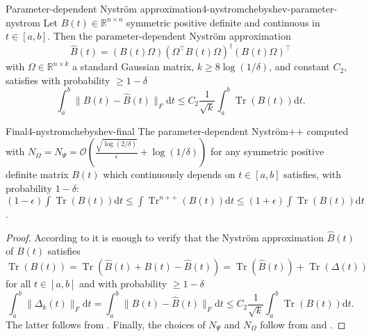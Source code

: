 \begin{lemma}{Parameter-dependent Nystr\"om approximation}{4-nystromchebyshev-parameter-nystrom}
    Let $B(t) \in \mathbb{R}^{n \times n}$ symmetric positive definite and continuous in $t \in [a, b]$. Then the parameter-dependent Nystr\"om approximation
    \begin{equation}
        \hat{B}(t) = (B(t) \Omega) (\Omega^{\top} B(t) \Omega)^{\dagger} (B(t) \Omega)^{\top}
    \end{equation}
    with $\Omega \in \mathbb{R}^{n \times k}$ a standard Gaussian matrix, $k \geq 8 \log(1/\delta)$, and constant $C_2$, satisfies with probability $\geq 1 - \delta$
    \begin{equation}
        \int_{a}^{b} \lVert B(t) - \hat{B}(t) \rVert _F \mathrm{d}t \leq C_2 \frac{1}{\sqrt{k}} \int_{a}^{b} \operatorname{Tr}(B(t)) \mathrm{d}t.
    \end{equation}
\end{lemma}

\begin{theorem}{Final}{4-nystromchebyshev-final}
    The parameter-dependent Nystr\"om++ computed with $N_{\Omega} = N_{\Psi} = \mathcal{O}\left( \frac{\sqrt{\log(2/\delta)}}{\epsilon} + \log(1/\delta) \right)$ for any symmetric positive definite matrix $B(t)$ which continuously depends on $t \in [a, b]$ satisfies, with probability $1 - \delta$: $(1 - \epsilon) \int \operatorname{Tr}(B(t)) \mathrm{d}t \leq \int \operatorname{Tr}^{n++}(B(t)) \mathrm{d}t \leq  (1 + \epsilon) \int \operatorname{Tr}(B(t)) \mathrm{d}t$.
\end{theorem}

\begin{proof}
    According to  it is enough to verify that the Nystr\"om approximation $\hat{B}(t)$ of $B(t)$ satisfies
    \begin{equation}
        \operatorname{Tr}(B(t)) = \operatorname{Tr}(\hat{B}(t) + B(t) - \hat{B}(t)) = \operatorname{Tr}(\hat{B}(t)) + \operatorname{Tr}(\Delta(t))
    \end{equation}
    for all $t \in [a, b]$ and with probability $\geq 1 - \delta$
    \begin{equation}
        \int_{a}^{b} \lVert \Delta_k(t) \rVert _F \mathrm{d}t = \int_{a}^{b} \lVert B(t) - \hat{B}(t) \rVert _F \mathrm{d}t \leq C_2 \frac{1}{\sqrt{k}} \int_{a}^{b} \operatorname{Tr}(B(t)) \mathrm{d}t.
    \end{equation}
    The latter follows from . Finally, the choices of $N_{\Psi}$ and $N_{\Omega}$ follow from  and .
\end{proof}
